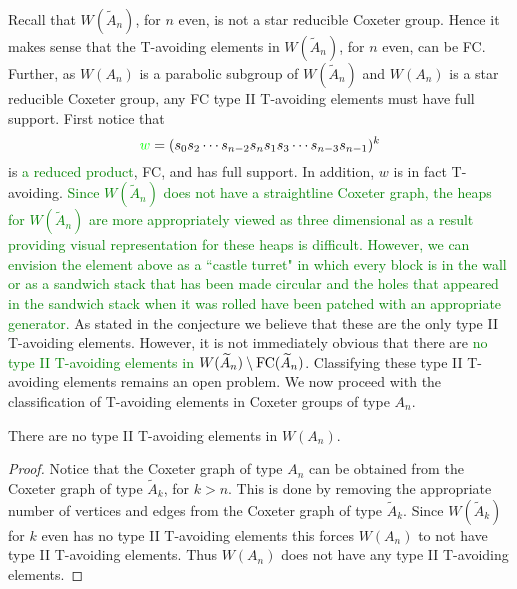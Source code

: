 Recall that $W(\widetilde{A}_n)$, for $n$ even, is not a star reducible Coxeter group. Hence it makes sense that the T-avoiding elements in $W(\widetilde{A}_n)$, for $n$ even, can be FC. Further, as $W(A_n)$ is a parabolic subgroup of $W(\widetilde{A}_n)$ and $W(A_n)$ is a star reducible Coxeter group, any FC type II T-avoiding elements must have full support. First notice that \[\textcolor{green}{w}=(s_0s_2 \cdots s_{n-2}s_ns_1s_3 \cdots s_{n-3}s_{n-1})^k\] is \textcolor{green}{a reduced product}, FC, and has full support. In addition, $w$ is in fact T-avoiding. \textcolor{green}{Since $W(\widetilde{A}_n)$ does not have a straightline Coxeter graph, the heaps for $W(\widetilde{A}_n)$ are more appropriately viewed as three dimensional as a result providing visual representation for these heaps is difficult. However, we can envision the element above as a ``castle turret" in which every block is in the wall or as a sandwich stack that has been made circular and the holes that appeared in the sandwich stack when it was rolled have been patched with an appropriate generator.} As stated in the conjecture we believe that these are the only type II T-avoiding elements. However, it is not immediately obvious that there are \textcolor{green}{no type II T-avoiding elements in $W(\widetilde{A}_n)\setminus \mathrm{FC}(\widetilde{A}_n)$}. Classifying these type II T-avoiding elements remains an open problem. We now proceed with the classification of T-avoiding elements in Coxeter groups of type $A_n$. 

\begin{corollary}
There are no type II T-avoiding elements in $W(A_n)$. 
\begin{proof}
Notice that the Coxeter graph of type $A_n$ can be obtained from the Coxeter graph of type $\widetilde{A}_k$, for $k > n$. This is done by removing the appropriate number of vertices and edges from the Coxeter graph of type $\widetilde{A}_k$. Since $W(\widetilde{A}_k)$ for $k$ even has no type II T-avoiding elements this forces $W(A_n)$ to not have type II T-avoiding elements. Thus $W(A_n)$ does not have any type II T-avoiding elements.  
\end{proof}
\end{corollary}


